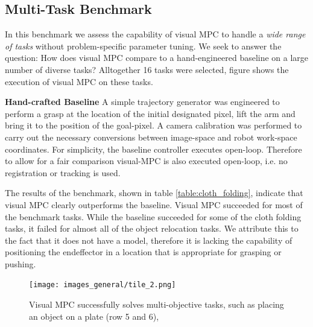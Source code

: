 \subsection{Multi-Task Benchmark}
\label{subsec:multi_task_bench}
In this benchmark we  assess the capability of visual MPC to handle a \emph{wide range of tasks} without problem-specific parameter tuning. We seek to answer the question: How does visual MPC compare to a hand-engineered baseline on a large number of diverse tasks? 
Alltogether 16 tasks were selected, figure  shows the execution of visual MPC on these tasks. 

\noindent \textbf{Hand-crafted Baseline} A simple trajectory generator was engineered to perform a grasp at the location of the initial designated pixel, lift the arm and bring it to the position of the goal-pixel. A camera calibration was performed to carry out the necessary conversions between image-space and robot work-space coordinates. For simplicity, the baseline controller executes open-loop. Therefore to allow for a fair comparison visual-MPC is also executed open-loop, i.e. no registration or tracking is used.

The results of the benchmark, shown in table \ref{table:cloth_folding}, indicate that visual MPC clearly outperforms the baseline. 
Visual MPC succeeded for most of the benchmark tasks. While the baseline succeeded for some of the cloth folding tasks, it failed for almost all of the object relocation tasks. We attribute this to the fact that it does not have a model, therefore it is lacking the capability of positioning the endeffector in a location that is appropriate for grasping or pushing. 

\begin{figure}
	\centering
	\texttt{[image: images\_general/tile\_2.png]}
	\caption{Visual MPC successfully solves multi-objective tasks, such as placing an object on a plate (row 5 and 6),   
		\label{fig:tile_2}}
\end{figure}

